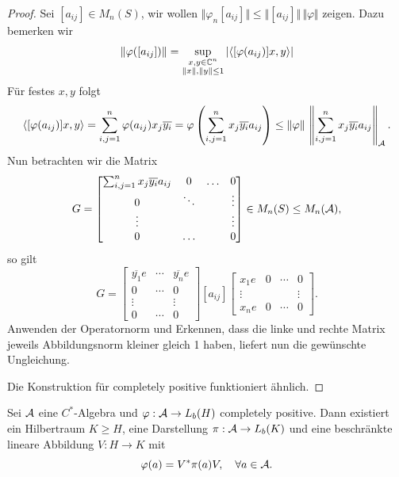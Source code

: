 \begin{proof}
    Sei $[a_{ij}] \in M_n(S)$, wir wollen $\Vert \varphi_n [a_{ij}] \Vert \leq \Vert [a_{ij}] \Vert \, \Vert \varphi \Vert$ zeigen. Dazu bemerken wir
    \[
        \Vert \varphi([a_{ij}]) \Vert
        =
        \sup_{\substack{x,y \in \mathbb{C}^n \\ \Vert x \Vert, \Vert y \Vert \leq 1}} \vert \langle [\varphi(a_{ij})] x, y \rangle \vert
    \]
    Für festes $x, y$ folgt
    \[
        \langle [\varphi(a_{ij})] x, y \rangle
        =
        \sum_{i,j=1}^n \varphi(a_{ij}) x_j \overline{y_i}
        =
        \varphi \left( \sum_{i,j=1}^n x_j \overline{y_i} a_{ij} \right)
        \leq
        \Vert \varphi \Vert \, \left\Vert \sum_{i,j=1}^n x_j \overline{y_i} a_{ij} \right\Vert_{\mathcal{A}}.
    \]
    Nun betrachten wir die Matrix
    \[
        G = \begin{bmatrix}
            \sum_{i,j=1}^n x_j \overline{y_i} a_{ij} & 0 & \ldots & 0 \\
            0 & \ddots & & \vdots \\
            \vdots & & & \vdots \\
            0 & \ldots & & 0
        \end{bmatrix} \in M_n(S) \leq M_n(\mathcal{A}),
    \]
    so gilt
    \[
        G = \begin{bmatrix}
            \overline{y_1} e & \cdots & \overline{y_n} e \\
            0 & \cdots & 0 \\
            \vdots & & \vdots \\
            0 & \cdots & 0
        \end{bmatrix}
        [a_{ij}]
        \begin{bmatrix}
            x_1 e & 0 & \cdots & 0 \\
            \vdots & & & \vdots \\
            x_n e & 0 & \cdots & 0
        \end{bmatrix}.
    \]
    Anwenden der Operatornorm und Erkennen, dass die linke und rechte Matrix jeweils Abbildungsnorm kleiner gleich 1 haben, liefert nun die gewünschte Ungleichung.

    Die Konstruktion für completely positive funktioniert ähnlich.
\end{proof}

\begin{theorem}    
    Sei $\mathcal{A}$ eine $C^*$-Algebra und $\varphi : \mathcal{A} \to L_b(H)$ completely positive. Dann existiert ein Hilbertraum $K \geq H$, eine Darstellung $\pi : \mathcal{A} \to L_b(K)$ und eine beschränkte lineare Abbildung $V : H \to K$ mit
    \[
        \varphi(a) = V^* \pi(a) V, \quad \forall a \in \mathcal{A}.
    \]
\end{theorem}
